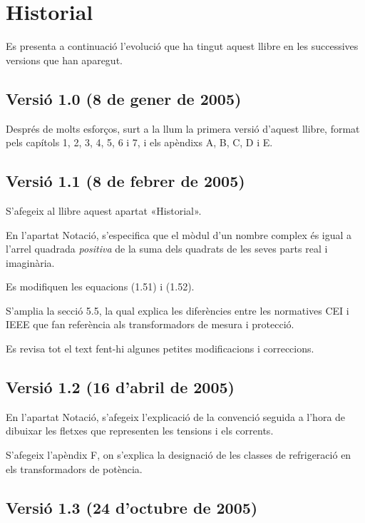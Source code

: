 \chapter*{Historial}

Es presenta a continuació l'evolució que ha tingut aquest llibre en
les successives versions que han aparegut.

\section*{Versió 1.0 (8 de gener de 2005)}

Després de molts esforços, surt a la llum la primera versió d'aquest
llibre, format pels capítols 1, 2, 3, 4, 5, 6 i 7, i els apèndixs A,
B, C, D i E.

\section*{Versió 1.1 (8 de febrer de 2005)}

S'afegeix al llibre aquest apartat «Historial».

En l'apartat Notació, s'especifica que el mòdul d'un nombre
complex és igual a l'arrel quadrada \emph{positiva} de la suma dels
quadrats de les seves parts real i imaginària.

Es modifiquen les equacions (1.51) i (1.52).

S'amplia la secció 5.5, la qual explica les diferències entre les
normatives CEI i IEEE que fan referència als
transformadors de mesura i protecció.

Es revisa tot el text fent-hi algunes petites modificacions i
correccions.

\section*{Versió 1.2 (16 d'abril de 2005)}

En l'apartat Notació, s'afegeix l'explicació de la convenció
seguida a l'hora de dibuixar les fletxes que representen les
tensions i els corrents.

S'afegeix l'apèndix F, on s'explica la designació de les classes de
refrigeració en els transformadors de potència.

\section*{Versió 1.3 (24 d'octubre de 2005)}

